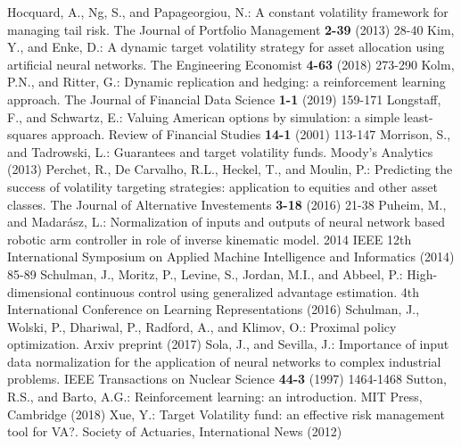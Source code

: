 \documentclass[runningheads]{m2ef}
\begin{document}
\begin{thebibliography}{99}
	Hocquard, A., Ng, S., and Papageorgiou, N.: A constant volatility framework for managing tail risk. The Journal of Portfolio Management {\bf 2-39} (2013) 28-40
	Kim, Y., and Enke, D.: A dynamic target volatility strategy for asset allocation using artificial neural networks. The Engineering Economist {\bf 4-63} (2018) 273-290
	Kolm, P.N., and Ritter, G.: Dynamic replication and hedging: a reinforcement learning approach. The Journal of Financial Data Science {\bf 1-1} (2019) 159-171
	Longstaff, F., and Schwartz, E.: Valuing American options by simulation: a simple least-squares approach. Review of Financial Studies {\bf 14-1} (2001) 113-147
	Morrison, S., and Tadrowski, L.: Guarantees and target volatility funds. Moody's Analytics (2013)
	Perchet, R., De Carvalho, R.L., Heckel, T., and Moulin, P.: Predicting the success of volatility targeting strategies: application to equities and other asset classes. The Journal of Alternative Investements {\bf 3-18} (2016) 21-38
	Puheim, M., and Madar\'{a}sz, L.: Normalization of inputs and outputs of neural network based robotic arm controller in role of inverse kinematic model. 2014 IEEE 12th International Symposium on Applied Machine Intelligence and Informatics (2014) 85-89
	Schulman, J., Moritz, P., Levine, S., Jordan, M.I., and Abbeel, P.: High-dimensional continuous control using generalized advantage estimation. 4th International Conference on Learning Representations (2016)
	Schulman, J.,  Wolski, P., Dhariwal, P., Radford, A., and Klimov, O.: Proximal policy optimization. Arxiv preprint (2017)
	Sola, J., and Sevilla, J.: Importance of input data normalization for the application of neural networks to complex industrial problems. IEEE Transactions on Nuclear Science {\bf 44-3} (1997) 1464-1468
	Sutton, R.S., and Barto, A.G.: Reinforcement learning: an introduction. MIT Press, Cambridge (2018)
	Xue, Y.: Target Volatility fund: an effective risk management tool for VA?. Society of Actuaries, International News (2012)
	\end{thebibliography}

	\vfill

	\footnotesize{\vskip1mm$\!\!\!\!\!\!\!\!\!\!${}}


	
\end{document}
